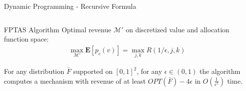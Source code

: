 \documentclass{beamer}
\begin{document}
\begin{frame}{Dynamic Programming - Recursive Formula}
\begin{columns}
\begin{column}{.4\textwidth}
\begin{center}
      \end{center}
    \end{column}
  \end{columns}
\end{frame}

\begin{frame}{FPTAS Algorithm}
  Optimal revenue $\mathcal{M}'$ on discretized value and allocation function space:
  \begin{align*}
    \max_{\mathcal{M}'} \mathbf{E}\left[p_c(v)\right] = \max_{j,k} R(1/\epsilon, j, k)
  \end{align*}

  \begin{theorem}
    For any distribution $\bar{F}$ supported on $[0,1]^2$, for any $\epsilon \in (0,1)$ the algorithm computes a mechanism with revenue of at least $OPT(\bar{F}) - 4\epsilon$ in $O(\frac{1}{\epsilon^5})$ time.
  \end{theorem}
\end{frame}
\end{document}
